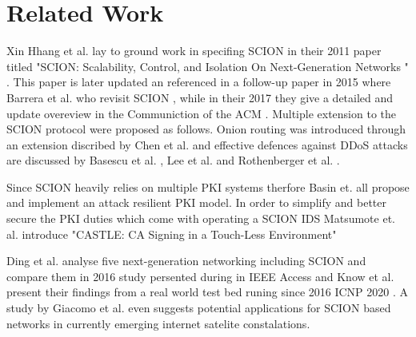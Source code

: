 \documentclass[../eva1_scion.tex]{subfiles}
\begin{document}
    \section{Related Work}\label{sec:related_work}

    Xin Hhang et al. lay to ground work in specifing SCION in their 2011 paper titled "SCION: Scalability, Control, and Isolation On Next-Generation Networks
" \cite{scion_2011}. This paper is later updated an referenced in a follow-up paper in 2015 where Barrera et al. who revisit SCION \cite{scion_2015}, while in their 2017 they give a detailed and update overeview in the Communiction of the ACM \cite{scion_2017}. Multiple extension to the SCION protocol were proposed as follows. Onion routing was introduced through an extension discribed by Chen et al. \cite{hornet_2015, hornet_2016} and effective defences against DDoS attacks are discussed by Basescu et al. \cite{sibra_2016}, Lee et al. \cite{lee_2017} and Rothenberger et al. \cite{piskes_2020}.

Since SCION heavily relies on multiple PKI systems therfore Basin et. all propose \cite{arpki_2014} and implement \cite{arpki_2018} an attack resilient PKI model. In order to simplify and better secure the PKI duties which come with operating a SCION IDS Matsumote et. al. introduce "CASTLE: CA Signing in a Touch-Less Environment" \cite{castle_2016} 

Ding et al. analyse five next-generation networking including SCION and compare them in 2016 study persented during in IEEE Access \cite{ding_2016} and Know et al. present their findings from a real world test bed runing since 2016 ICNP 2020 \cite{testbed_2020}. A study by Giacomo et al. even suggests potential applications for SCION based networks in currently emerging internet satelite constalations.\cite{giuliari_2020}
\end{document}
